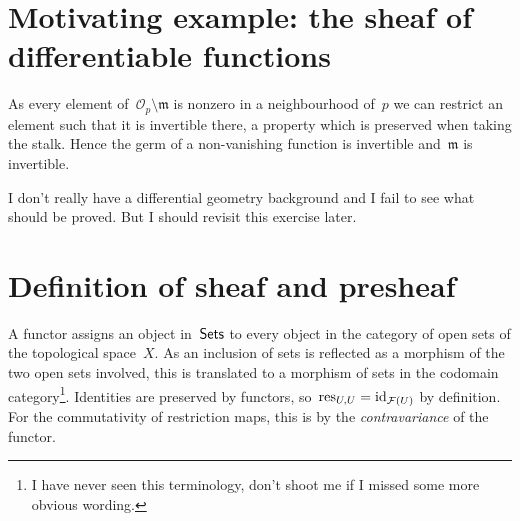 \section{Motivating example: the sheaf of differentiable functions}

\begin{exercise}
  As every element of~$\mathcal{O}_p\setminus\mathfrak{m}$ is nonzero in a neighbourhood of~$p$ we can restrict an element such that it is invertible there, a property which is preserved when taking the stalk. Hence the germ of a non-vanishing function is invertible and~$\mathfrak{m}$ is invertible.
\end{exercise}

\begin{exercise}
  \label{exercise:31b}
  I don't really have a differential geometry background and I fail to see what should be proved. But I should revisit this exercise later.
\end{exercise}


\section{Definition of sheaf and presheaf}

\begin{exercise}
  A functor assigns an object in~$\mathsf{Sets}$ to every object in the category of open sets of the topological space~$X$. As an inclusion of sets is reflected as a morphism of the two open sets involved, this is translated to a morphism of sets in the codomain category\footnote{I have never seen this terminology, don't shoot me if I missed some more obvious wording.}. Identities are preserved by functors, so~$\operatorname{res}_{U,U}=\mathrm{id}_{\mathcal{F}(U)}$ by definition. For the commutativity of restriction maps, this is by the \emph{contravariance} of the functor.
\end{exercise}

